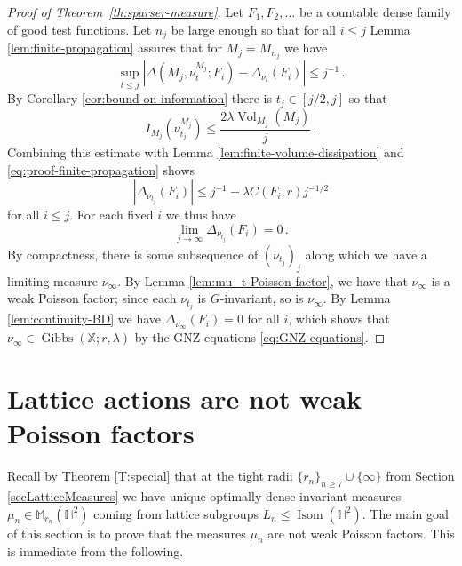 \documentclass[11pt]{amsart}
\theoremstyle{definition}
\theoremstyle{remark}
\renewcommand{\H}{\mathbb{H}}
\newcommand{\M}{\mathbb{M}}
\newcommand{\bX}{\mathbb{X}}
\newcommand{\Isom}{\operatorname{Isom}}
\newcommand{\Vol}{\operatorname{Vol}}
\newcommand{\Gibbs}{\operatorname{Gibbs}}
\begin{document}
\begin{proof}[Proof of Theorem~\ref{th:sparser-measure}]
    Let $F_1,F_2,\ldots$ be a countable dense family of good test functions.  Let $n_j$ be large enough so that for all $i \leq j$ Lemma \ref{lem:finite-propagation} assures that for $M_j = M_{n_j}$ we have \begin{equation}\label{eq:proof-finite-propagation}
        \sup_{t \leq j} \left|\Delta\left(M_j, \nu_t^{M_j};F_i\right) - \Delta_{\nu_t}(F_i) \right| \leq j^{-1} \,.
    \end{equation}
%
    By Corollary \ref{cor:bound-on-information} there is  $t_j \in [j/2,j]$ so that \begin{equation*}
        I_{M_j}\left(\nu_{t_j}^{M_j}\right) \leq \frac{2 \lambda \Vol_{M_j}(M_j)}{j}\,.
    \end{equation*}
    Combining this estimate with Lemma \ref{lem:finite-volume-dissipation}  and \eqref{eq:proof-finite-propagation} shows \begin{equation} \label{eq:bound-GNZ-diff-finite-vol}
        \left|\Delta_{\nu_{t_j}}(F_i)\right| \leq j^{-1} +  \lambda C(F_i,r) j^{-1/2}
    \end{equation}
    for all $i \leq j$.  For each fixed $i$ we thus have  $$\lim_{j \to \infty} \Delta_{\nu_{t_j}}(F_i) = 0\,.$$
    By compactness, there is some subsequence of $(\nu_{t_j})_{j}$ along which we have a limiting measure $\nu_\infty.$  By Lemma \ref{lem:mu_t-Poisson-factor}, we have that $\nu_\infty$ is a weak Poisson factor; since each $\nu_{t_j}$ is $G$-invariant, so is $\nu_\infty$. By Lemma \ref{lem:continuity-BD} we have $\Delta_{\nu_\infty}(F_i) = 0$ for all $i$, which shows that $\nu_\infty \in \Gibbs(\bX;r,\lambda)$ by the GNZ equations \eqref{eq:GNZ-equations}.  
\end{proof}



\section{Lattice actions are not weak Poisson factors}
\label{secLattice}

Recall by Theorem \ref{T:special} that at the tight radii $\{r_n\}_{n \geq 7} \cup \{\infty\}$ from Section \ref{secLatticeMeasures} we have unique optimally dense invariant measures $\mu_n \in \M_{r_n}(\H^2)$ coming from lattice subgroups $L_n \leq \Isom(\H^2)$.  The main goal of this section is to prove that the measures $\mu_n$ are not weak Poisson factors.  This is immediate from the following.
\end{document}
